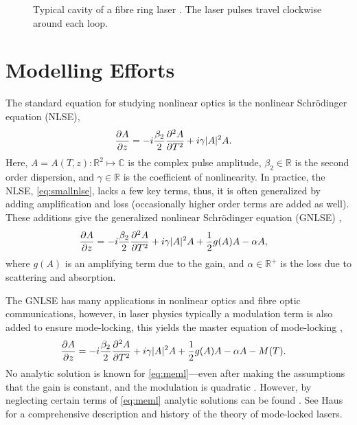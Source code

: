 \documentclass[9pt,twocolumn,twoside]{osajnl}
\newcommand{\pdiff}[3][\hspace{-0.5pt}]{\frac{\partial^{#1}#2}{\partial{#3}^{#1}}} %
\begin{document}
\begin{figure}[tbp]
	\centering
	
	\caption{Typical cavity of a fibre ring laser \cite{burgoyne2014, chung2017, lapre2019, shao2019, tang2014}. The laser pulses travel clockwise around each loop.}
	\label{fig:cavity}
\end{figure}

\section{Modelling Efforts}
\label{sec:modelling}
The standard equation for studying nonlinear optics is the nonlinear Schr\"odinger equation (NLSE),
\begin{align}
	\pdiff{A}{z} &= - i \frac{\beta_2}{2}\pdiff[2]{A}{T} + i \gamma |A|^2 A.
	\label{eq:smallnlse}
\end{align}
Here, $A = A(T, z) : \mathbb{R}^2 \mapsto \mathbb{C}$ is the complex pulse amplitude, $\beta_2 \in \mathbb{R}$ is the second order dispersion, and $\gamma \in \mathbb{R}$ is the coefficient of nonlinearity. In practice, the NLSE, \eqref{eq:smallnlse}, lacks a few key terms, thus, it is often generalized by adding amplification and loss (occasionally higher order terms are added as well). These additions give the generalized nonlinear Schr\"{o}dinger equation (GNLSE) \cite{agrawal2013, bohun2015, finot2008, peng2018, shtyrina2017, yarutkina2013},
	\begin{align}
	\pdiff{A}{z} &= - i \frac{\beta_2}{2}\pdiff[2]{A}{T} + i \gamma |A|^2 A + \frac{1}{2}g(A) A - \alpha A,
	\label{eq:nlse}
\end{align}
where $g(A)$ is an amplifying term due to the gain, and $\alpha \in \mathbb{R}^+$ is the loss due to scattering and absorption.

The GNLSE has many applications in nonlinear optics and fibre optic communications, however, in laser physics typically a modulation term is also added to ensure mode-locking, this yields the master equation of mode-locking \cite{haus1984, haus1975, haus1986, haus1992, haus2000, tamura1996, usechak2005},
\begin{align}
	\pdiff{A}{z} &= - i \frac{\beta_2}{2}\pdiff[2]{A}{T} + i \gamma |A|^2 A + \frac{1}{2}g(A) A - \alpha A - M(T).
	\label{eq:meml}
\end{align}
No analytic solution is known for \eqref{eq:meml}---even after making the assumptions that the gain is constant, and the modulation is quadratic \cite{haus1984, haus1975, haus1996}. However, by neglecting certain terms of \eqref{eq:meml} analytic solutions can be found \cite{burgoyne2014, haus1975, haus1986, haus1991, haus1992, haus1996, tamura1996, usechak2005}. See Haus \cite{haus2000} for a comprehensive description and history of the theory of mode-locked lasers.
\end{document}
